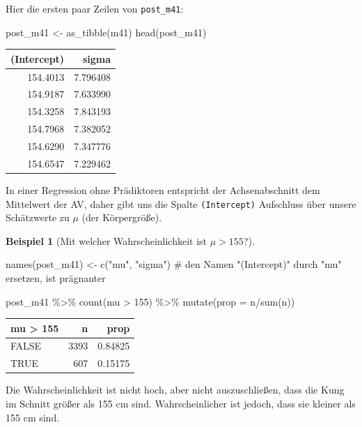 \documentclass[
  a4paper,
  DIV=11]{scrreprt}
\newenvironment{Shaded}{\begin{snugshade}}{\end{snugshade}}
\newcommand{\AttributeTok}[1]{\textcolor[rgb]{0.40,0.45,0.13}{#1}}
\newcommand{\CommentTok}[1]{\textcolor[rgb]{0.37,0.37,0.37}{#1}}
\newcommand{\DecValTok}[1]{\textcolor[rgb]{0.68,0.00,0.00}{#1}}
\newcommand{\FunctionTok}[1]{\textcolor[rgb]{0.28,0.35,0.67}{#1}}
\newcommand{\NormalTok}[1]{\textcolor[rgb]{0.00,0.23,0.31}{#1}}
\newcommand{\OtherTok}[1]{\textcolor[rgb]{0.00,0.23,0.31}{#1}}
\newcommand{\SpecialCharTok}[1]{\textcolor[rgb]{0.37,0.37,0.37}{#1}}
\newcommand{\StringTok}[1]{\textcolor[rgb]{0.13,0.47,0.30}{#1}}
\theoremstyle{definition}
\newtheorem{example}{Beispiel}[chapter]
\theoremstyle{remark}
\begin{document}
Hier die ersten paar Zeilen von \texttt{post\_m41}:

\begin{Shaded}
\begin{Highlighting}[]
\NormalTok{post\_m41 }\OtherTok{\textless{}{-}} \FunctionTok{as\_tibble}\NormalTok{(m41)}
\FunctionTok{head}\NormalTok{(post\_m41)}
\end{Highlighting}
\end{Shaded}

\begin{longtable}[]{@{}rr@{}}
\toprule()
(Intercept) & sigma \\
\midrule()
\endhead
154.4013 & 7.796408 \\
154.9187 & 7.633990 \\
154.3258 & 7.843193 \\
154.7968 & 7.382052 \\
154.6290 & 7.347776 \\
154.6547 & 7.229462 \\
\bottomrule()
\end{longtable}

In einer Regression ohne Prädiktoren entspricht der Achsenabschnitt dem
Mittelwert der AV, daher gibt uns die Spalte \texttt{(Intercept)}
Aufschluss über unsere Schätzwerte zu \(\mu\) (der Körpergröße).

\leavevmode{}%
\begin{example}[Mit welcher Wahrscheinlichkeit ist
\(\mu>155\)?]\label{exm-kung1}

\begin{Shaded}
\begin{Highlighting}[]

\FunctionTok{names}\NormalTok{(post\_m41) }\OtherTok{\textless{}{-}} 
  \FunctionTok{c}\NormalTok{(}\StringTok{"mu"}\NormalTok{, }\StringTok{"sigma"}\NormalTok{)  }\CommentTok{\# den Namen "(Intercept)" durch "mu" ersetzen, ist prägnanter}

\NormalTok{post\_m41 }\SpecialCharTok{\%\textgreater{}\%} 
  \FunctionTok{count}\NormalTok{(mu }\SpecialCharTok{\textgreater{}} \DecValTok{155}\NormalTok{) }\SpecialCharTok{\%\textgreater{}\%} 
  \FunctionTok{mutate}\NormalTok{(}\AttributeTok{prop =}\NormalTok{ n}\SpecialCharTok{/}\FunctionTok{sum}\NormalTok{(n))}
\end{Highlighting}
\end{Shaded}

\begin{longtable}[]{@{}lrr@{}}
\toprule()
mu \textgreater{} 155 & n & prop \\
\midrule()
\endhead
FALSE & 3393 & 0.84825 \\
TRUE & 607 & 0.15175 \\
\bottomrule()
\end{longtable}

Die Wahrscheinlichkeit ist nicht hoch, aber nicht auszuschließen, dass
die Kung im Schnitt größer als 155 cm sind. Wahrscheinlicher ist jedoch,
dass sie kleiner als 155 cm sind.

\end{example}
\end{document}
